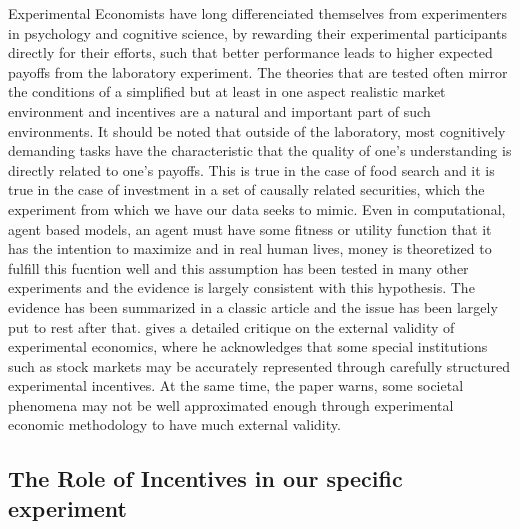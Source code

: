 Experimental Economists have long differenciated themselves from experimenters in psychology and cognitive science, by rewarding their experimental participants directly for their efforts, such that better performance leads to higher expected payoffs from the laboratory experiment. The theories that are tested often mirror the conditions of a simplified but at least in one aspect realistic market environment and incentives are a natural and important part of such environments. It should be noted that outside of the laboratory, most cognitively demanding tasks have the characteristic that the quality of one's understanding is directly related to one's payoffs. This is true in the case of food search and it is true in the case of investment in a set of causally related securities, which the experiment from which we have our data seeks to mimic. Even in computational, agent based models, an agent must have some fitness or utility function that it has the intention to maximize \cite{dennett1989intentional} and in real human lives, money is theoretized to fulfill this fucntion well and this assumption has been tested in many other experiments and the evidence is largely consistent with this hypothesis.  The evidence has been summarized in a classic article \cite{smith1993} and the issue has been largely put to rest after that.    \cite{loewenstein99} gives a detailed critique on the external validity of experimental economics, where he acknowledges that some special institutions such as stock markets may be accurately represented through carefully structured experimental incentives. At the same time, the paper warns, some societal phenomena may not be well approximated enough through experimental economic methodology to have much external validity.   


\subsection{The Role of Incentives in our specific experiment}

